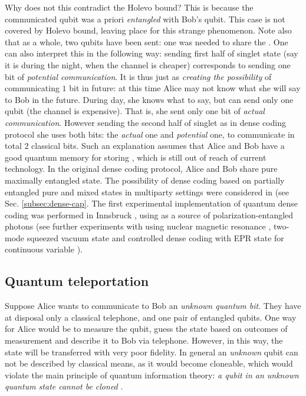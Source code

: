 \documentclass[twocolumn,aps,rmp]{revtex4}
\begin{document}
Why does not this contradict the Holevo bound? This is because the
communicated qubit was a priori {\it entangled} with Bob's qubit. This
case is not covered by Holevo bound, leaving place for this strange
phenomenon. Note also that as a whole, two qubits have been sent: one
was needed to share the \eprstate. One can also interpret this in the
following way: sending first half of singlet state (say it is during
the night, when the channel is cheaper) corresponds to sending one bit
of {\it potential communication}. It is thus just as {\it creating the
  possibility} of communicating $1$ bit in future: at this time Alice
may not know what she will say to Bob in the future. During day, she
knows what to say, but can send only one qubit (the channel is
expensive). That is, she sent only one bit of {\it actual
  communication}. However sending the second half of singlet as in
dense coding protocol she uses both bits: the {\it actual} one and
{\it potential} one, to communicate in total $2$ classical bits. Such
an explanation assumes that Alice and Bob have a good quantum memory
for storing \eprstates, which is still out of reach of current
technology. In the original dense coding protocol, Alice and Bob share
pure maximally entangled state.  The possibility of dense coding based
on partially entangled pure and mixed states in multiparty settings
were considered in
\cite{BarencoE1995-dense,HausladenJSWW1996-cl-cap,mixed_dense_coding,not_so_super_dc,BosePV_1998dense,ZimanB2003_dense}
(see Sec. \ref{subsec:dense-cap}. The first experimental implementation of quantum dense coding was performed in Innsbruck \cite {Dense_practical}, using as a source of polarization-entangled photons (see further experiments with using nuclear magnetic resonance \cite{FangZFDM1999}, two-mode squeezed vacuum state \cite {MizunoWFS2005} and  controlled dense coding with EPR state for continuous variable \cite {JietaiJYFXCK2003}).

\subsection{Quantum teleportation}
\label{subsec:Telep}

Suppose Alice wants to communicate to Bob an {\it unknown quantum
  bit}. They have at disposal only a classical telephone, and one pair
of entangled qubits. One way for Alice would be to measure the qubit,
guess the state based on outcomes of measurement and describe it to
Bob via telephone. However, in this way, the state will be transferred
with very poor fidelity. In general an {\it unknown} qubit can not be
described by classical means, as it would become cloneable, which
would violate the main principle of quantum information theory: {\it a
  qubit in an unknown quantum state cannot be cloned}
\cite{WoottersZ-cloning,Dieks-cloning}.
\end{document}
